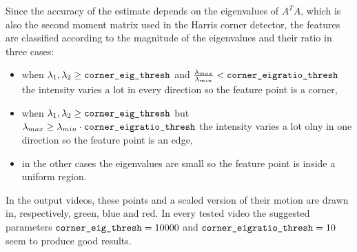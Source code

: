 \documentclass[a4paper,oneside]{article}
\newcommand{\textinlinecode}[1]{\lstinline[basicstyle=\ttfamily,keywordstyle={},stringstyle={},commentstyle={\itshape}]{#1}}
\newcommand{\inlinecode}[1]{\ifmmode\text{\textinlinecode{#1}}\else\textinlinecode{#1}\fi}
\begin{document}
Since the accuracy of the estimate depends on the eigenvalues of
$A^TA$, which is also the second moment matrix used in the Harris
corner detector, the features are classified according to the
magnitude of the eigenvalues and their ratio in three cases:
\begin{itemize}
  \item when $\lambda_1, \lambda_2 \geq
    \inlinecode{corner_eig_thresh}$ and
    $\frac{\lambda_{max}}{\lambda_{min}} <
    \inlinecode{corner_eigratio_thresh}$ the intensity varies a lot in
    every direction so the feature point is a corner,
    \item when $\lambda_1, \lambda_2 \geq
      \inlinecode{corner_eig_thresh}$ but $\lambda_{max} \geq
      \lambda_{min} \cdot \inlinecode{corner_eigratio_thresh}$ the
      intensity varies a lot olny in one direction so the feature
      point is an edge,
    \item in the other cases the eigenvalues are small so the feature
      point is inside a uniform region.
\end{itemize}
In the output videos, these points and a scaled version of their
motion are drawn in, respectively, green, blue and red. In every
tested video the suggested parameters $ \inlinecode{corner_eig_thresh}
= 10000$ and $ \inlinecode{corner_eigratio_thresh} = 10$ seem to
produce good results.
\end{document}
